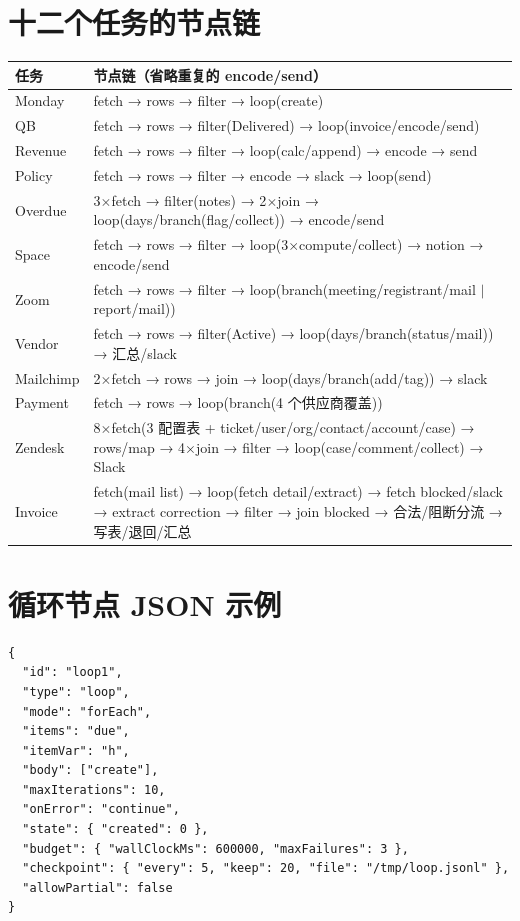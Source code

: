 \documentclass[UTF8,a4paper,10pt]{ctexart}
\begin{document}
\section{十二个任务的节点链}
\begin{longtable}{p{}p{}}
\toprule
任务 & 节点链（省略重复的 encode/send） \\
\midrule
\endhead
Monday & fetch → rows → filter → loop(create) \\
QB & fetch → rows → filter(Delivered) → loop(invoice/encode/send) \\
Revenue & fetch → rows → filter → loop(calc/append) → encode → send \\
Policy & fetch → rows → filter → encode → slack → loop(send) \\
Overdue & 3$\times$fetch → filter(notes) → 2$\times$join → loop(days/branch(flag/collect)) → encode/send \\
Space & fetch → rows → filter → loop(3$\times$compute/collect) → notion → encode/send \\
Zoom & fetch → rows → filter → loop(branch(meeting/registrant/mail $\mid$ report/mail)) \\
Vendor & fetch → rows → filter(Active) → loop(days/branch(status/mail)) → 汇总/slack \\
Mailchimp & 2$\times$fetch → rows → join → loop(days/branch(add/tag)) → slack \\
Payment & fetch → rows → loop(branch(4 个供应商覆盖)) \\
Zendesk & 8$\times$fetch(3 配置表 + ticket/user/org/contact/account/case) → rows/map → 4$\times$join → filter → loop(case/comment/collect) → Slack \\
Invoice & fetch(mail list) → loop(fetch detail/extract) → fetch blocked/slack → extract correction → filter → join blocked → 合法/阻断分流 → 写表/退回/汇总 \\
\bottomrule
\end{longtable}

\section{循环节点 JSON 示例}
\begin{verbatim}
{
  "id": "loop1",
  "type": "loop",
  "mode": "forEach",
  "items": "due",
  "itemVar": "h",
  "body": ["create"],
  "maxIterations": 10,
  "onError": "continue",
  "state": { "created": 0 },
  "budget": { "wallClockMs": 600000, "maxFailures": 3 },
  "checkpoint": { "every": 5, "keep": 20, "file": "/tmp/loop.jsonl" },
  "allowPartial": false
}
\end{verbatim}
\end{document}
